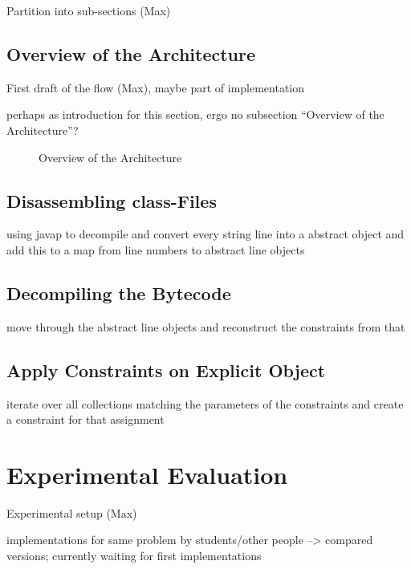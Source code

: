 \documentclass[conference]{IEEEtran}
\begin{document}
\danger Partition into sub-sections (Max)

\subsection{Overview of the Architecture}
\label{sec:impl_overv-arch}

\danger First draft of the flow (Max), maybe part of implementation

\danger perhaps as introduction for this section, ergo no subsection ``Overview
of the Architecture''?

\begin{figure*}[!ht]
  \centering
  \label{fig:architecture}
  \tikzarchitecture
  \caption{Overview of the Architecture}
\end{figure*}

\subsection{Disassembling class-Files}
\label{sec:impl_disassembling}

\danger using javap to decompile and convert every string line into a abstract
object and add this to a map from line numbers to abstract line objects

\subsection{Decompiling the Bytecode}
\label{sec:impl_decompiling}

\danger move through the abstract line objects and reconstruct the constraints
from that

\subsection{Apply Constraints on Explicit Object}
\label{sec:impl_applying}

\danger iterate over all collections matching the parameters of the constraints
and create a constraint for that assignment

\section{Experimental Evaluation}
\label{sec:exper-eval}

\danger Experimental setup (Max)

\danger implementations for same problem by students/other people --> compared
versions; currently waiting for first implementations
\end{document}
